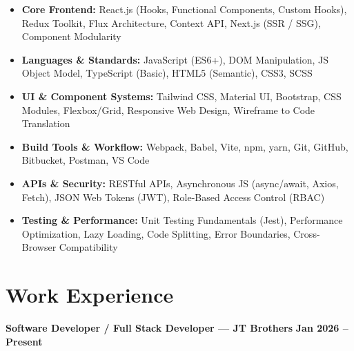 \documentclass[a4paper,10pt]{article}
\begin{document}
\begin{itemize}

    \item \textbf{Core Frontend:}
    React.js (Hooks, Functional Components, Custom Hooks), Redux Toolkit,
    Flux Architecture, Context API, Next.js (SSR / SSG), Component Modularity

    \item \textbf{Languages \& Standards:}
    JavaScript (ES6+), DOM Manipulation, JS Object Model, TypeScript (Basic),
    HTML5 (Semantic), CSS3, SCSS

    \item \textbf{UI \& Component Systems:}
    Tailwind CSS, Material UI, Bootstrap, CSS Modules, Flexbox/Grid, Responsive Web Design,
    Wireframe to Code Translation

    \item \textbf{Build Tools \& Workflow:}
    Webpack, Babel, Vite, npm, yarn, Git, GitHub, Bitbucket, Postman, VS Code

    \item \textbf{APIs \& Security:}
    RESTful APIs, Asynchronous JS (async/await, Axios, Fetch),
    JSON Web Tokens (JWT), Role-Based Access Control (RBAC)

    \item \textbf{Testing \& Performance:}
    Unit Testing Fundamentals (Jest), Performance Optimization, Lazy Loading,
    Code Splitting, Error Boundaries, Cross-Browser Compatibility

\end{itemize}

\section*{Work Experience}

\textbf{Software Developer / Full Stack Developer --- JT Brothers}
\hfill
\textbf{Jan 2026 -- Present}
\end{document}

